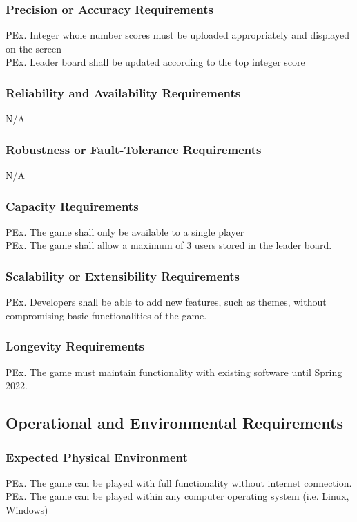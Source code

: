 \documentclass{article}
\begin{document}
    \subsubsection{Precision or Accuracy Requirements}
    PEx. Integer whole number scores must be uploaded appropriately and displayed on the screen\\
    PEx. Leader board shall be updated according to the top integer score
    
    \subsubsection{Reliability and Availability Requirements}
    N/A

    \subsubsection{Robustness or Fault-Tolerance Requirements}
    N/A
    
    \subsubsection{Capacity Requirements}
    PEx. The game shall only be available to a single player\\
    PEx. The game shall allow a maximum of 3 users stored in the leader board.
    
    \subsubsection{Scalability or Extensibility Requirements}
    PEx. Developers shall be able to add new features, such as themes, without compromising basic functionalities of the game. 
    
    \subsubsection{Longevity Requirements}
    PEx. The game must maintain functionality with existing software until Spring 2022.


\subsection{Operational and Environmental Requirements}
    \subsubsection{Expected Physical Environment}
    PEx. The game can be played with full functionality without internet connection.\\
    PEx. The game can be played within any computer operating system (i.e. Linux, Windows)
    
\end{document}

